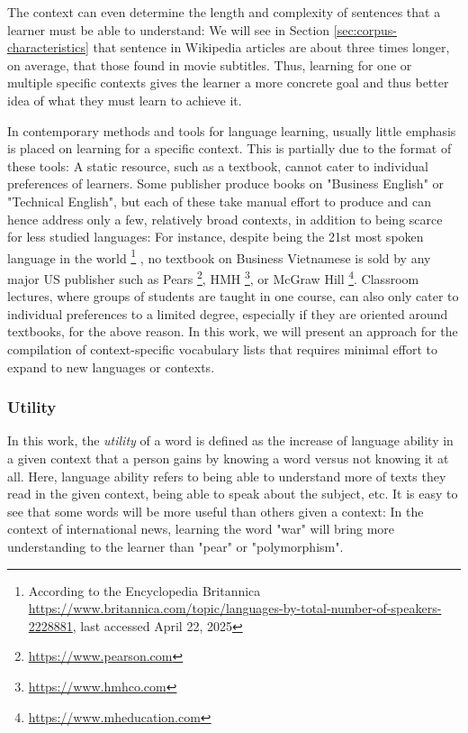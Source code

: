 The context can even determine the length and complexity of sentences that a learner must be able to understand:
We will see in Section \ref{sec:corpus-characteristics} that sentence in Wikipedia articles are about three times longer, on average, that those found in movie subtitles.
Thus, learning for one or multiple specific contexts gives the learner a more concrete goal and thus better idea of what they must learn to achieve it.

In contemporary methods and tools for language learning, usually little emphasis is placed on learning for a specific context.
This is partially due to the format of these tools:
A static resource, such as a textbook, cannot cater to individual preferences of learners.
Some publisher produce books on "Business English" or "Technical English", but each of these take manual effort to produce and can hence address only a few, relatively broad contexts, in addition to being scarce for less studied languages:
For instance, despite being the 21st most spoken language in the world
\footnote{According to the Encyclopedia Britannica \url{https://www.britannica.com/topic/languages-by-total-number-of-speakers-2228881}, last accessed April 22, 2025}
, no textbook on Business Vietnamese is sold by any major US publisher such as Pears \footnote{\url{https://www.pearson.com}}, HMH \footnote{\url{https://www.hmhco.com}}, or McGraw Hill \footnote{\url{https://www.mheducation.com}}.
Classroom lectures, where groups of students are taught in one course, can also only cater to individual preferences to a limited degree, especially if they are oriented around textbooks, for the above reason.
In this work, we will present an approach for the compilation of context-specific vocabulary lists that requires minimal effort to expand to new languages or contexts.

\subsubsection{Utility} \label{sec:utility}
In this work, the \textit{utility} of a word is defined as the increase of language ability in a given context that a person gains by knowing a word versus not knowing it at all.
Here, language ability refers to being able to understand more of texts they read in the given context, being able to speak about the subject, etc.
It is easy to see that some words will be more useful than others given a context:
In the context of international news, learning the word "war" will bring more understanding to the learner than "pear" or "polymorphism".

